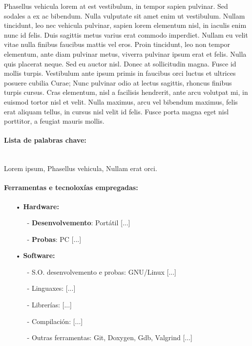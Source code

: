 \documentclass{pfc}
\begin{document}
Phasellus vehicula lorem at est vestibulum, in tempor sapien
pulvinar. Sed sodales a ex ac bibendum. Nulla vulputate sit amet enim
ut vestibulum. Nullam tincidunt, leo nec vehicula pulvinar, sapien
lorem elementum nisl, in iaculis enim nunc id felis. Duis sagittis
metus varius erat commodo imperdiet. Nullam eu velit vitae nulla
finibus faucibus mattis vel eros. Proin tincidunt, leo non tempor
elementum, ante diam pulvinar metus, viverra pulvinar ipsum erat et
felis. Nulla quis placerat neque. Sed eu auctor nisl. Donec at
sollicitudin magna. Fusce id mollis turpis. Vestibulum ante ipsum
primis in faucibus orci luctus et ultrices posuere cubilia Curae; Nunc
pulvinar odio at lectus sagittis, rhoncus finibus turpis cursus. Cras
elementum, nisl a facilisis hendrerit, ante arcu volutpat mi, in
euismod tortor nisl et velit. Nulla maximus, arcu vel bibendum
maximus, felis erat aliquam tellus, in cursus nisl velit id
felis. Fusce porta magna eget nisl porttitor, a feugiat mauris mollis.

\blankpage

\paragraph{\large Lista de palabras chave:\\\\}

Lorem ipsum, Phasellus vehicula, Nullam erat orci.

\blankpage

\paragraph{\large Ferramentas e tecnoloxías empregadas:\\}

\begin{itemize}
\item[•] \textbf{Hardware:}

\begin{itemize}
\item[-] \textbf{Desenvolvemento}: Portátil [...]
\item[-] \textbf{Probas}: PC [...]
\end{itemize}

\item[•] \textbf{Software:}

\begin{itemize}
\item[-] S.O. desenvolvemento e probas: GNU/Linux [...]
\item[-] Linguaxes: [...]
\item[-] Librerías: [...]
\item[-] Compilación: [...]
\item[-] Outras ferramentas: Git, Doxygen, Gdb, Valgrind [...]
\end{itemize}

\end{itemize}
\end{document}
